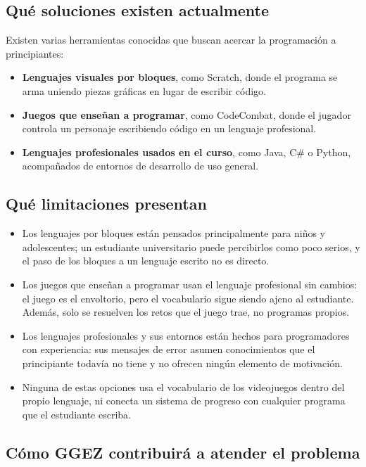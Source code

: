 \subsection*{Qué soluciones existen actualmente}

Existen varias herramientas conocidas que buscan acercar la programación a principiantes:

\begin{itemize}
  \item \textbf{Lenguajes visuales por bloques}, como Scratch, donde el programa se arma uniendo piezas gráficas en lugar de escribir código.
  \item \textbf{Juegos que enseñan a programar}, como CodeCombat, donde el jugador controla un personaje escribiendo código en un lenguaje profesional.
  \item \textbf{Lenguajes profesionales usados en el curso}, como Java, C\# o Python, acompañados de entornos de desarrollo de uso general.
\end{itemize}

\subsection*{Qué limitaciones presentan}

\begin{itemize}
  \item Los lenguajes por bloques están pensados principalmente para niños y adolescentes; un estudiante universitario puede percibirlos como poco serios, y el paso de los bloques a un lenguaje escrito no es directo.
  \item Los juegos que enseñan a programar usan el lenguaje profesional sin cambios: el juego es el envoltorio, pero el vocabulario sigue siendo ajeno al estudiante. Además, solo se resuelven los retos que el juego trae, no programas propios.
  \item Los lenguajes profesionales y sus entornos están hechos para programadores con experiencia: sus mensajes de error asumen conocimientos que el principiante todavía no tiene y no ofrecen ningún elemento de motivación.
  \item Ninguna de estas opciones usa el vocabulario de los videojuegos dentro del propio lenguaje, ni conecta un sistema de progreso con cualquier programa que el estudiante escriba.
\end{itemize}

\subsection*{Cómo GGEZ contribuirá a atender el problema}

